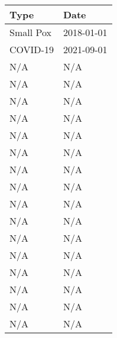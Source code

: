 \documentclass[b6paper,10pt]{article}
\begin{document}
        \begin{minipage}[b][110mm][t]{77mm}
            \raggedright

            \ttfamily
            \begin{tabu} {|X|l|}
                \hline
                \textbf{\sffamily Type} & \textbf{\sffamily Date} \\
                \hline
                \textcolor{Sepia}{Small Pox} & \textcolor{Sepia}{2018-01-01} \\
                \hline
                \textcolor{Sepia}{COVID-19} & \textcolor{Sepia}{2021-09-01} \\
                \hline
                \textcolor{Sepia}{N/A} & \textcolor{Sepia}{N/A} \\ \hline
                \textcolor{Sepia}{N/A} & \textcolor{Sepia}{N/A} \\ \hline
                \textcolor{Sepia}{N/A} & \textcolor{Sepia}{N/A} \\ \hline
                \textcolor{Sepia}{N/A} & \textcolor{Sepia}{N/A} \\ \hline
                \textcolor{Sepia}{N/A} & \textcolor{Sepia}{N/A} \\ \hline
                \textcolor{Sepia}{N/A} & \textcolor{Sepia}{N/A} \\ \hline
                \textcolor{Sepia}{N/A} & \textcolor{Sepia}{N/A} \\ \hline
                \textcolor{Sepia}{N/A} & \textcolor{Sepia}{N/A} \\ \hline
                \textcolor{Sepia}{N/A} & \textcolor{Sepia}{N/A} \\ \hline
                \textcolor{Sepia}{N/A} & \textcolor{Sepia}{N/A} \\ \hline
                \textcolor{Sepia}{N/A} & \textcolor{Sepia}{N/A} \\ \hline
                \textcolor{Sepia}{N/A} & \textcolor{Sepia}{N/A} \\ \hline
                \textcolor{Sepia}{N/A} & \textcolor{Sepia}{N/A} \\ \hline
                \textcolor{Sepia}{N/A} & \textcolor{Sepia}{N/A} \\ \hline
                \textcolor{Sepia}{N/A} & \textcolor{Sepia}{N/A} \\ \hline
                \textcolor{Sepia}{N/A} & \textcolor{Sepia}{N/A} \\ \hline
            \end{tabu}

            \vfill


        \end{minipage}%
\end{document}
